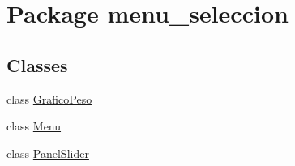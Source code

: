 \hypertarget{namespacemenu__seleccion}{}\section{Package menu\+\_\+seleccion}
\label{namespacemenu__seleccion}
\subsection*{Classes}
\begin{DoxyCompactItemize}
\item 
class \mbox{\hyperlink{classmenu__seleccion_1_1_grafico_peso}{Grafico\+Peso}}
\item 
class \mbox{\hyperlink{classmenu__seleccion_1_1_menu}{Menu}}
\item 
class \mbox{\hyperlink{classmenu__seleccion_1_1_panel_slider}{Panel\+Slider}}
\end{DoxyCompactItemize}

